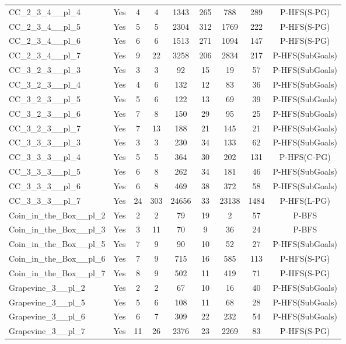 \documentclass{article}
\begin{document}
\begin{tabular}{lcccccccc}
CC\_2\_3\_4\_\_pl\_4 & Yes & 4 & 4 & 1343 & 265 & 788 & 289 & P-HFS(S-PG) \\
CC\_2\_3\_4\_\_pl\_5 & Yes & 5 & 5 & 2304 & 312 & 1769 & 222 & P-HFS(S-PG) \\
CC\_2\_3\_4\_\_pl\_6 & Yes & 6 & 6 & 1513 & 271 & 1094 & 147 & P-HFS(S-PG) \\
CC\_2\_3\_4\_\_pl\_7 & Yes & 9 & 22 & 3258 & 206 & 2834 & 217 & P-HFS(SubGoals) \\
CC\_3\_2\_3\_\_pl\_3 & Yes & 3 & 3 & 92 & 15 & 19 & 57 & P-HFS(SubGoals) \\
CC\_3\_2\_3\_\_pl\_4 & Yes & 4 & 6 & 132 & 12 & 83 & 36 & P-HFS(SubGoals) \\
CC\_3\_2\_3\_\_pl\_5 & Yes & 5 & 6 & 122 & 13 & 69 & 39 & P-HFS(SubGoals) \\
CC\_3\_2\_3\_\_pl\_6 & Yes & 7 & 8 & 150 & 29 & 95 & 25 & P-HFS(SubGoals) \\
CC\_3\_2\_3\_\_pl\_7 & Yes & 7 & 13 & 188 & 21 & 145 & 21 & P-HFS(SubGoals) \\
CC\_3\_3\_3\_\_pl\_3 & Yes & 3 & 3 & 230 & 34 & 133 & 62 & P-HFS(SubGoals) \\
CC\_3\_3\_3\_\_pl\_4 & Yes & 5 & 5 & 364 & 30 & 202 & 131 & P-HFS(C-PG) \\
CC\_3\_3\_3\_\_pl\_5 & Yes & 6 & 8 & 262 & 34 & 181 & 46 & P-HFS(SubGoals) \\
CC\_3\_3\_3\_\_pl\_6 & Yes & 6 & 8 & 469 & 38 & 372 & 58 & P-HFS(SubGoals) \\
CC\_3\_3\_3\_\_pl\_7 & Yes & 24 & 303 & 24656 & 33 & 23138 & 1484 & P-HFS(L-PG) \\
Coin\_in\_the\_Box\_\_pl\_2 & Yes & 2 & 2 & 79 & 19 & 2 & 57 & P-BFS \\
Coin\_in\_the\_Box\_\_pl\_3 & Yes & 3 & 11 & 70 & 9 & 36 & 24 & P-BFS \\
Coin\_in\_the\_Box\_\_pl\_5 & Yes & 7 & 9 & 90 & 10 & 52 & 27 & P-HFS(SubGoals) \\
Coin\_in\_the\_Box\_\_pl\_6 & Yes & 7 & 9 & 715 & 16 & 585 & 113 & P-HFS(S-PG) \\
Coin\_in\_the\_Box\_\_pl\_7 & Yes & 8 & 9 & 502 & 11 & 419 & 71 & P-HFS(S-PG) \\
Grapevine\_3\_\_pl\_2 & Yes & 2 & 2 & 67 & 10 & 16 & 40 & P-HFS(SubGoals) \\
Grapevine\_3\_\_pl\_5 & Yes & 5 & 6 & 108 & 11 & 68 & 28 & P-HFS(SubGoals) \\
Grapevine\_3\_\_pl\_6 & Yes & 6 & 7 & 309 & 22 & 232 & 54 & P-HFS(SubGoals) \\
Grapevine\_3\_\_pl\_7 & Yes & 11 & 26 & 2376 & 23 & 2269 & 83 & P-HFS(S-PG) \\

\end{tabular}
\end{document}
